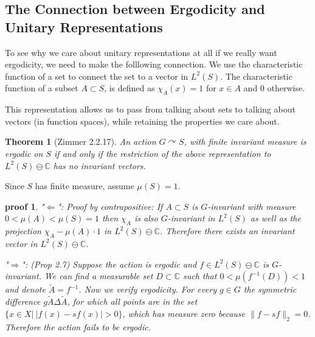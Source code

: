 \documentclass[
  12pt
]{article}
\theoremstyle{break}
\newtheorem{thm}{Theorem}[section]
\theoremstyle{plain}
\newtheorem*{pf}{proof}
\begin{document}
  \hypertarget{the-connection-between-ergodicity-and-unitary-representations}{%
  \subsection{The Connection between Ergodicity and Unitary Representations}\label{the-connection-between-ergodicity-and-unitary-representations}}

  To see why we care about unitary representations at all if we really
  want ergodicity, we need to make the folllowing connection. We use the
  characteristic function of a set to connect the set to a vector in
  $L^2(S)$. The characteristic function of a subset $A\subset S$, is
  defined as $\chi_A(x) = 1$ for $x \in A$ and $0$ otherwise.

  This representation allows us to pass from talking about sets to talking
  about vectors (in function spaces), while retaining the properties we care
  about.

  \begin{thm}[Zimmer 2.2.17]
    \label{thm:2.2.17}
    An action $G\curvearrowright S$, with \emph{ finite } invariant measure is
    ergodic on $S$ if and only if the restriction of the above representation
    to $L^2(S) \ominus \mathbb{C}$ has no invariant vectors.
  \end{thm}
    
  Since $S$ has finite measure, assume $\mu(S) =1$.

  \begin{pf}

    "$\Leftarrow$": Proof by contrapositive:
    If $A\subset S$ is $G$-invariant
    with measure $0 < \mu(A) < \mu(S) = 1$ then $\chi_A$ is also $G$-invariant
    in $L^2(S)$ as well as the projection $\chi_A - \mu(A)\cdot 1$ in
    $L^2(S)\ominus \mathbb{C}$. Therefore there exists an invariant vector in
    $L^2(S)\ominus \mathbb{C}$.

    "$\Rightarrow$": \cite{Kerr16}(Prop 2.7)
    Suppose the action is ergodic and $f\in L^2(S)\ominus \mathbb{C}$ is
    $G$-invariant. We can find a measurable set $D\subset \mathbb{C}$ such that
    $0<\mu(f^{-1}(D)) < 1$ and denote $\widetilde{A} = f^{-1}$. Now we verify
    ergodicity. For every $g\in G$ the symmetric difference $g\widetilde{A}
    \Delta \widetilde{A}$, for which all points are in the set $\{x \in X | \
    |f(x)-sf(x)| > 0\}$, which has measure zero because $\|f- sf\|_2=0$.
    Therefore the action fails to be ergodic.
  \end{pf}
\end{document}
